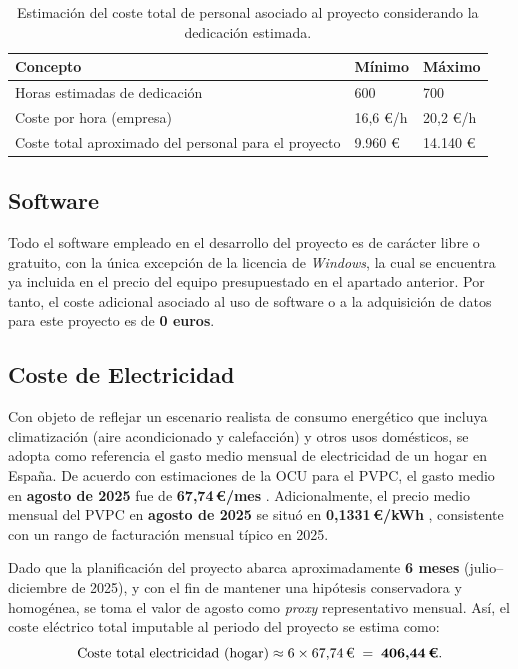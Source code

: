 \documentclass{report}
\begin{document}
\begin{table}[H]
\centering
\begin{tabular}{|p{4cm}|p{3cm}|p{3cm}|}
\hline
\textbf{Concepto} & \textbf{Mínimo} & \textbf{Máximo} \\
\hline
Horas estimadas de dedicación & 600 & 700 \\
\hline
Coste por hora (empresa) & 16,6 €/h & 20,2 €/h \\
\hline
Coste total aproximado del personal para el proyecto & 9.960 € & 14.140 € \\
\hline
\end{tabular}
\caption{Estimación del coste total de personal asociado al proyecto considerando la dedicación estimada.}
\label{tab:coste-proyecto}
\end{table}

\subsection{Software}
Todo el software empleado en el desarrollo del proyecto es de carácter libre o gratuito, con la única excepción de la licencia de \textit{Windows}, la cual se encuentra ya incluida en el precio del equipo presupuestado en el apartado anterior. 
Por tanto, el coste adicional asociado al uso de software o a la adquisición de datos para este proyecto es de \textbf{0 euros}.

\subsection{Coste de Electricidad }

Con objeto de reflejar un escenario realista de consumo energético que incluya climatización (aire acondicionado y calefacción) y otros usos domésticos, se adopta como referencia el gasto medio mensual de electricidad de un hogar en España. 
De acuerdo con estimaciones de la OCU para el PVPC, el gasto medio en \textbf{agosto de 2025} fue de \textbf{67,74\,€/mes} \cite{OCU_Precio_Luz_2025}. 
Adicionalmente, el precio medio mensual del PVPC en \textbf{agosto de 2025} se situó en \textbf{0,1331\,€/kWh} \cite{CosteEnergia_PVPC_2025}, consistente con un rango de facturación mensual típico en 2025.

Dado que la planificación del proyecto abarca aproximadamente \textbf{6 meses} (julio–diciembre de 2025), y con el fin de mantener una hipótesis conservadora y homogénea, se toma el valor de agosto como \emph{proxy} representativo mensual. 
Así, el coste eléctrico total imputable al periodo del proyecto se estima como:
\[
\text{Coste total electricidad (hogar)} \approx 6 \times 67{,}74\,\text{€} \;=\; \textbf{406{,}44\,€}.
\]
\end{document}

